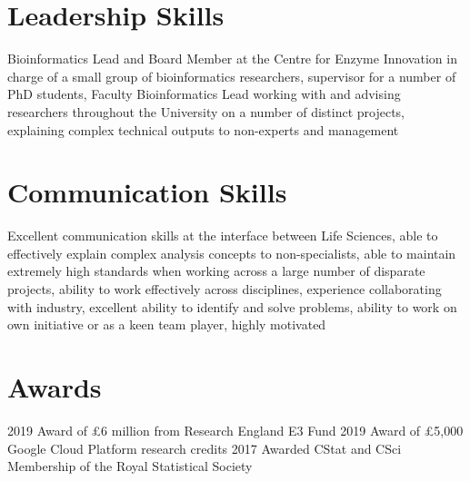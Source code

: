 \documentclass[letterpaper]{twentysecondcv} %
\begin{document}
\section{Leadership Skills}

Bioinformatics Lead and Board Member at the Centre for Enzyme Innovation in charge of a small group of bioinformatics researchers, supervisor for a number of PhD students, Faculty Bioinformatics Lead working with and advising researchers throughout the University on a number of distinct projects, explaining complex technical outputs to non-experts and management \\


\section{Communication Skills}

Excellent communication skills at the interface between Life Sciences, able to effectively explain complex analysis concepts to non-specialists, able to maintain extremely high standards when working across a large number of disparate projects, ability to work effectively across disciplines, experience collaborating with industry, excellent ability to identify and solve problems, ability to work on own initiative or as a keen team player, highly motivated \\




\section{Awards}

\begin{twentyshort}
  \twentyitemshort
    {2019}
    {Award of £6 million from Research England E3 Fund}
  \twentyitemshort
    {2019}
    {Award of £5,000 Google Cloud Platform research credits} 
  \twentyitemshort
    {2017}
    {Awarded CStat and CSci Membership of the Royal Statistical Society}
\end{twentyshort}
\end{document}
